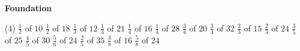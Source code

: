 \documentclass[17pt,a4paper,landscape]{extarticle}
\begin{document}
\sffamily
\boldmath

\boldmath

\vspace*{0.4em}
{\LARGE \textbf{Foundation}}
\begin{tasks}(4)
\task \mbox{$\frac{1}{2}$} of \mbox{$10$}
\task \mbox{$\frac{1}{2}$} of \mbox{$18$}
\task \mbox{$\frac{1}{3}$} of \mbox{$12$}
\task \mbox{$\frac{1}{3}$} of \mbox{$21$}
\task \mbox{$\frac{1}{4}$} of \mbox{$16$}
\task \mbox{$\frac{1}{4}$} of \mbox{$28$}
\task \mbox{$\frac{3}{4}$} of \mbox{$20$}
\task \mbox{$\frac{3}{4}$} of \mbox{$32$}
\task \mbox{$\frac{2}{3}$} of \mbox{$15$}
\task \mbox{$\frac{2}{3}$} of \mbox{$24$}
\task \mbox{$\frac{3}{5}$} of \mbox{$25$}
\task \mbox{$\frac{4}{5}$} of \mbox{$30$}
\task \mbox{$\frac{5}{6}$} of \mbox{$24$}
\task \mbox{$\frac{2}{5}$} of \mbox{$35$}
\task \mbox{$\frac{3}{8}$} of \mbox{$16$}
\task \mbox{$\frac{5}{8}$} of \mbox{$24$}
\end{tasks}
\end{document}
